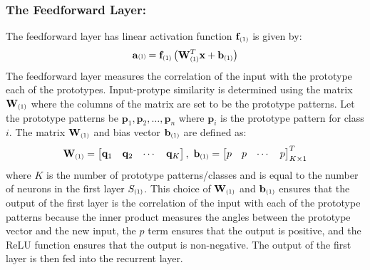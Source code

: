 \subsubsection{The Feedforward Layer:}
The feedforward layer has linear activation function \(\mathbf{f}_{{\scaleto{(1)}{6pt}}}\) is given by: 
\[\mathbf{a}{\scaleto{(1)}{6pt}}=\mathbf{f}_{\scaleto{(1)}{6pt}}\left(\mathbf{W}^T_{\scaleto{(1)}{6pt}}\mathbf{x}+\mathbf{b}_{\scaleto{(1)}{6pt}}\right)\]
The feedforward layer measures the correlation of the input with the prototype each of the prototypes. Input-protype similarity is determined using the matrix \(\mathbf{W}_{\scaleto{(1)}{6pt}}\) where the columns of the matrix are set to be the prototype patterns. Let the prototype patterns be \(\mathbf{p}_1,\mathbf{p}_2,\dots,\mathbf{p}_n\) where \(\mathbf{p}_i\) is the prototype pattern for class \(i\). The matrix \(\mathbf{W}_{\scaleto{(1)}{6pt}}\) and bias vector \(\mathbf{b}_{\scaleto{(1)}{6pt}}\) are defined as:
\[
\mathbf{W}_{\scaleto{(1)}{6pt}}=
    \begin{bmatrix}
        \mathbf{q}_1 & \mathbf{q}_2 & \cdots & \mathbf{q}_K
    \end{bmatrix},\  
        \mathbf{b}_{\scaleto{(1)}{6pt}}=\begin{bmatrix}
            p & p & \cdots & p
    \end{bmatrix}_{K\times 1}^T
\]%
where \(K\) is the number of prototype patterns/classes and is equal to the number of neurons in the first layer \(S_{\scaleto{(1)}{6pt}}\). This choice of \(\mathbf{W}_{\scaleto{(1)}{6pt}}\) and \(\mathbf{b}_{\scaleto{(1)}{6pt}}\) ensures that the output of the first layer is the correlation of the input with each of the prototype patterns because the inner product measures the angles between the prototype vector and the new input, the \(p\) term ensures that the output is positive, and the ReLU function ensures that the output is non-negative. The output of the first layer is then fed into the recurrent layer.\\
